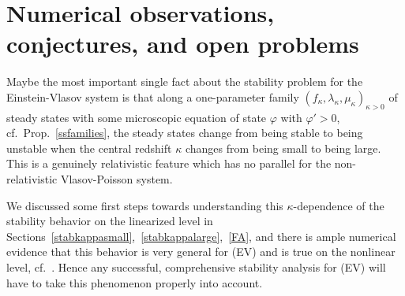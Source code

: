 \documentclass[11pt]{article}
\begin{document}
\section{Numerical observations, conjectures, and open problems}
%
\label{numetc}
\setcounter{equation}{0}
%
Maybe the most important single fact about the stability problem
for the Einstein-Vlasov system is that along a one-parameter family
$(f_\kappa,\lambda_\kappa,\mu_\kappa)_{\kappa>0}$ of steady states with
some microscopic equation of state $\varphi$ with $\varphi' > 0$,
cf.~Prop.~\ref{ssfamilies}, the steady states change
from being stable
to being unstable when the central redshift $\kappa$ changes from
being small to being large. This is a genuinely relativistic feature
which has no parallel for the non-relativistic Vlasov-Poisson system.

We discussed some first steps towards understanding
this $\kappa$-dependence of the stability behavior
on the linearized level in
Sections~\ref{stabkappasmall},~\ref{stabkappalarge},~\ref{FA},
and there is ample numerical evidence that this behavior is
very general for (EV)
and is true on the nonlinear level,
cf.~\cite{AnRe1,Gue_e_a,GueStRe21}. Hence any
successful, comprehensive stability analysis for (EV) will have to take this
phenomenon properly into account.
\end{document}
